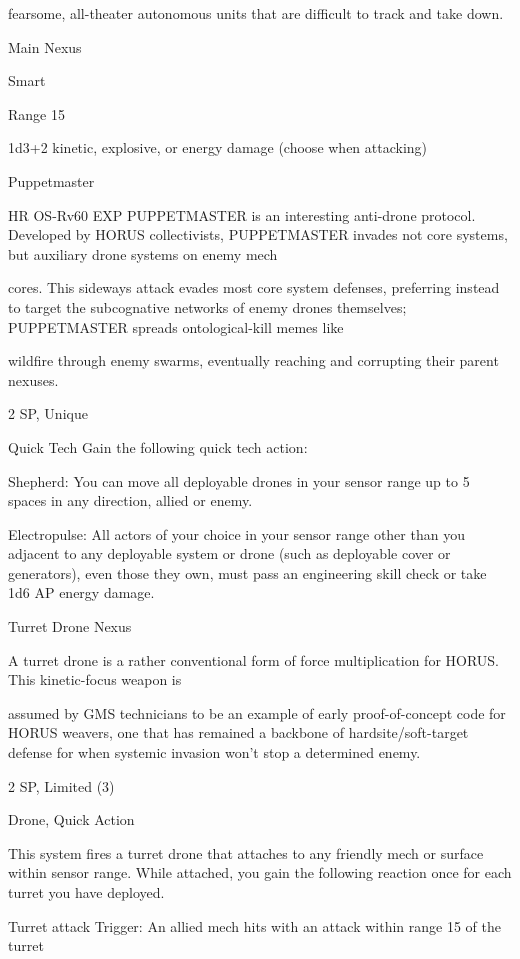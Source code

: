 fearsome, all-theater autonomous units that are difficult to track and take down.

Main Nexus

Smart

Range 15

1d3+2 kinetic, explosive, or energy damage (choose when attacking)





Puppetmaster

HR OS-Rv60 EXP PUPPETMASTER is an interesting anti-drone protocol. Developed by HORUS
collectivists, PUPPETMASTER invades not core systems, but auxiliary drone systems on enemy mech

cores. This sideways attack evades most core system defenses, preferring instead to target the
subcognative networks of enemy drones themselves; PUPPETMASTER spreads ontological-kill memes like

wildfire through enemy swarms, eventually reaching and corrupting their parent nexuses.

2 SP, Unique

Quick Tech
Gain the following quick tech action:

         Shepherd: You can move all deployable drones in your sensor range up to 5 spaces in
         any direction, allied or enemy.

         Electropulse: All actors of your choice in your sensor range other than you adjacent to
         any deployable system or drone (such as deployable cover or generators), even those
         they own, must pass an engineering skill check or take 1d6 AP energy damage.

Turret Drone Nexus

A turret drone is a rather conventional form of force multiplication for HORUS. This kinetic-focus weapon is

assumed by GMS technicians to be an example of early proof-of-concept code for HORUS weavers, one
that has remained a backbone of hardsite/soft-target defense for when systemic invasion won’t stop a
determined enemy.

2 SP, Limited (3)

Drone, Quick Action


This system fires a turret drone that attaches to any friendly mech or surface within sensor range.
While attached, you gain the following reaction once for each turret you have deployed.

	        Turret attack
	        Trigger: An allied mech hits with an attack within range 15 of the turret

